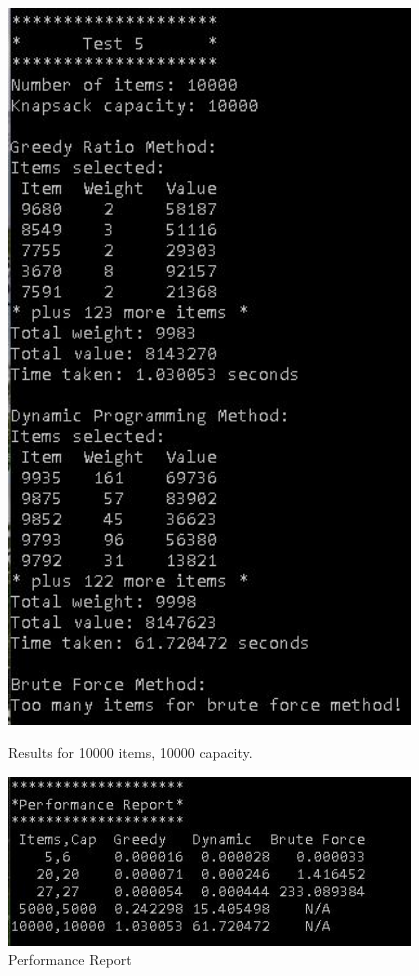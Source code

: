 \documentclass{article}
\begin{document}
\begin{figure}[H]
    \centering
    \begin{minipage}{0.49\textwidth}
        \centering
        \includegraphics[width=0.95\textwidth]{test5.JPG}
        \caption{Results for 10000 items, 10000 capacity.}
    \end{minipage}\hfill
    \begin{minipage}{0.49\textwidth}
        \centering
        \includegraphics[width=0.95\textwidth]{report.JPG}
        \caption{Performance Report}
    \end{minipage}\hfill
\end{figure}
\end{document}
